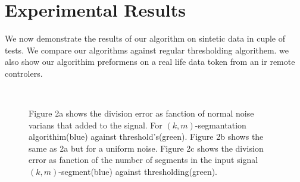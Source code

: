 \documentclass[12pt]{llncs}
\begin{document}
\section{Experimental Results} \label{Experimental Results}
We now demonstrate the results of our algorithm on sintetic data in cuple of tests. We compare our algorithms against regular thresholding algorithem. we also show our algorithim preformens on a real life data token from an ir remote controlers.

\begin{figure}[H]
\centering
{}  \\
\centering{}
\caption{Figure 2a shows the division error as fanction of normal noise varians that added to the signal. For $(k,m)$-segmantation algorithim(blue) against threshold's(green). Figure 2b shows the same as 2a but for a uniform noise. Figure 2c shows the division error as fanction of the number of segments in the input signal $(k,m)$-segment(blue) against  thresholding(green).  }
\noindent\makebox[\linewidth]{\rule{\textwidth}{0.4pt}}
\label{noise}
\end{figure}
\end{document}
